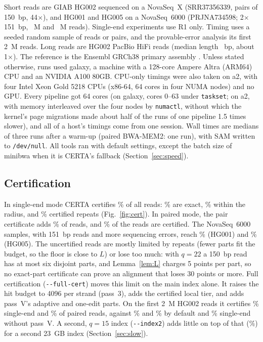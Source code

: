 \documentclass[11pt]{article}
\theoremstyle{definition}
\begin{document}
Short reads are GIAB HG002 \citep{zook2016giab} sequenced on a NovaSeq~X
(SRR37356339, \PePairs{} pairs of 150~bp, 44$\times$), and HG001 and HG005
on a NovaSeq~6000 (PRJNA734598; 2$\times$151~bp, \PeReadsMHGOne~M and
\PeReadsMHGFive~M reads). Single-end experiments use R1 only. Timing uses a
seeded random sample of \BenchReads{} reads or pairs, and the provable-error
analysis its first 2~M reads. Long reads are \LrReads{} HG002 PacBio HiFi
reads \citep{wenger2019hifi} (median length \LrMedLen~bp, about 1$\times$).
The reference is the Ensembl GRCh38 primary assembly
\citep{schneider2017grch38}. Unless stated otherwise, runs used galaxy, a
machine with a 128-core Ampere Altra (ARM64) CPU and an NVIDIA A100 80GB.
CPU-only timings were also taken on a2, with four Intel Xeon Gold 5218
CPUs (x86-64, 64 cores in four NUMA nodes) and no GPU. Every pipeline got
64 cores (on galaxy, cores 0--63 under \texttt{taskset}; on a2, with memory
interleaved over the four nodes by \texttt{numactl}, without which the
kernel's page migrations made about half of the runs of one pipeline 1.5
times slower), and all of a host's timings come from one session. Wall times are medians of three
runs after a warm-up (paired BWA-MEM2: one run), with SAM written to
\texttt{/dev/null}. All tools ran with default settings, except the batch
size of minibwa when it is CERTA's fallback (Section~\ref{sec:speed}).

\subsection{Certification}\label{sec:cert}

In single-end mode CERTA certifies \SeCert\% of all \SeReads{} reads:
\SeExact\% are exact, \SeEdits\% within the radius, and \SeRepeat\%
certified repeats (Fig.~\ref{fig:cert}). In paired mode, the pair
certificate adds \PeCertPR\% of reads, and \PeCert\% of the \PeReads{}
reads are certified. The NovaSeq~6000 samples, with 151~bp reads and more
sequencing errors, reach \PeCertHGOne\% (HG001) and \PeCertHGFive\%
(HG005). The uncertified reads are mostly limited by repeats (fewer parts
fit the budget, so the floor is close to $L$) or lose too much: with
$q=22$ a 150~bp read has at most six disjoint parts, and
Lemma~\ref{lem:L} charges 5 points per part, so no exact-part certificate
can prove an alignment that loses 30 points or more. Full certification
(\texttt{-{}-full-cert}) moves this limit on the main index alone. It
raises the hit budget to 4096 per strand (pass~3), adds the certified local
tier, and adds pass~V's adaptive and one-edit parts. On the first 2~M
HG002 reads it certifies \SlSeFcCert\% single-end and \SlPeFcCert\% of
paired reads, against \SlSeDefCert\% and \SlPeDefCert\% by default and
\SlSeNoVCert\% single-end without pass~V. A second, $q=15$ index
(\texttt{-{}-index2}) adds little on top of that (\SlSeIxCert\%) for a
second 23~GB index (Section~\ref{sec:slow}).
\end{document}
